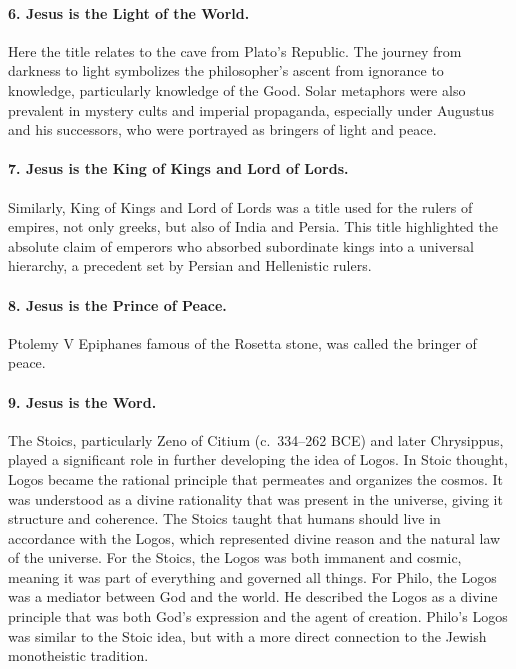 \paragraph{6.
Jesus is the Light of the World.}\label{par:jesus-is-the-light-of-the-world.}
Here the title relates to the cave from Plato’s Republic.
The journey from darkness to light symbolizes the philosopher’s ascent from ignorance to knowledge, particularly knowledge of the Good. Solar metaphors were also prevalent in mystery cults and imperial propaganda, especially under Augustus and his successors, who were portrayed as bringers of light and peace.
\paragraph{7.
Jesus is the King of Kings and Lord of Lords.}\label{par:jesus-is-the-king-of-kings-and-lord-of-lords.}
Similarly, King of Kings and Lord of Lords was a title used for the rulers of empires, not only greeks, but also of India and Persia. This title highlighted the absolute claim of emperors who absorbed subordinate kings into a universal hierarchy, a precedent set by Persian and Hellenistic rulers.
\paragraph{8.
Jesus is the Prince of Peace.}\label{par:jesus-is-the-prince-of-peace.}

Ptolemy V Epiphanes famous of the Rosetta stone, was called the bringer of peace.
\paragraph{9.
Jesus is the Word.}\label{par:jesus-is-the-word.}
The Stoics, particularly Zeno of Citium (c.~334–262 BCE) and later Chrysippus, played a significant role in further developing the idea of Logos.
In Stoic thought, Logos became the rational principle that permeates and organizes the cosmos.
It was understood as a divine rationality that was present in the universe, giving it structure and coherence.
The Stoics taught that humans should live in accordance with the Logos, which represented divine reason and the natural law of the universe.
For the Stoics, the Logos was both immanent and cosmic, meaning it was part of everything and governed all things.
For Philo, the Logos was a mediator between God and the world.
He described the Logos as a divine principle that was both God’s expression and the agent of creation.
Philo’s Logos was similar to the Stoic idea, but with a more direct connection to the Jewish monotheistic tradition.
